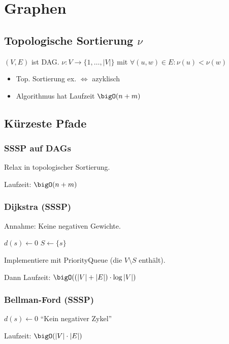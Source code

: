 \section*{Graphen}

\subsection*{Topologische Sortierung $\nu$}
$(V,E)$ ist DAG. $\nu: V \to \{1,\ldots,|V|\}$ mit
$\forall (u,w)\in E: \nu(u) < \nu(w)$

\begin{itemize}
	\item Top. Sortierung ex. $\iff$ azyklisch
	\item Algorithmus hat Laufzeit $\bigO(n+m)$
\end{itemize}

\subsection*{Kürzeste Pfade}

\subsubsection*{SSSP auf DAGs}
Relax in topologischer Sortierung.

Laufzeit: $\bigO(n+m)$

\subsubsection*{Dijkstra (SSSP)}
Annahme: Keine negativen Gewichte.
\begin{algorithm}[H]
	$d(s) \gets 0$\;
	$S \gets \{s\}$\;
\end{algorithm}

Implementiere mit PriorityQueue (die $V \setminus S$ enthält).

Dann Laufzeit: $\bigO((|V|+|E|)\cdot\log|V|)$

\subsubsection*{Bellman-Ford (SSSP)}
\begin{algorithm}[H]
	$d(s) \gets 0$\;
	\KwRet \enquote{Kein negativer Zykel}\;
\end{algorithm}
Laufzeit: $\bigO(|V|\cdot|E|)$

